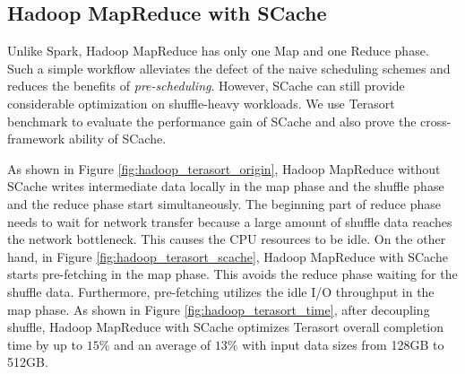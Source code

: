 {\color{black}
\subsection{Hadoop MapReduce with SCache}

{\color{blue}
Unlike Spark, Hadoop MapReduce has only one Map and one Reduce phase.
Such a simple workflow alleviates the defect of the naive scheduling schemes and reduces the benefits of \textit{pre-scheduling}.
However, SCache can still provide considerable optimization on shuffle-heavy workloads.
We use Terasort benchmark to evaluate the performance gain of SCache and also prove the cross-framework ability of SCache.
}

As shown in Figure \ref{fig:hadoop_terasort_origin}, Hadoop MapReduce without SCache writes intermediate data locally in the map phase and the shuffle phase and the reduce phase start simultaneously. The beginning part of reduce phase needs to wait for network transfer because a large amount of shuffle data reaches the network bottleneck. This causes the CPU resources to be idle. 
On the other hand, in Figure \ref{fig:hadoop_terasort_scache}, Hadoop MapReduce with SCache starts pre-fetching in the map phase. This avoids the reduce phase waiting for the shuffle data. Furthermore, pre-fetching utilizes the idle I/O throughput in the map phase. As shown in Figure \ref{fig:hadoop_terasort_time}, after decoupling shuffle, Hadoop MapReduce with SCache optimizes Terasort overall completion time by up to $15\%$ and an average of $13\%$ with input data sizes from 128GB to 512GB.
}


